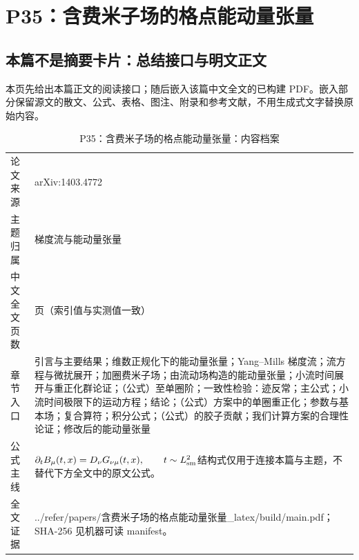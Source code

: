 \documentclass[UTF8,11pt,oneside]{ctexbook}
\begin{document}
\chapter{P35：含费米子场的格点能动量张量}
\section*{本篇不是摘要卡片：总结接口与明文正文}
本页先给出本篇正文的阅读接口；随后嵌入该篇中文全文的已构建 PDF。嵌入部分保留源文的散文、公式、表格、图注、附录和参考文献，不用生成式文字替换原始内容。
\begin{table}[htbp]
  \centering
  \caption{P35：含费米子场的格点能动量张量：内容档案}
  \small
  \begin{tabularx}{0.96\textwidth}{@{}p{3.3cm}>{\raggedright\arraybackslash}X@{}}
    \toprule
    论文来源 & arXiv:1403.4772 \\
    主题归属 & 梯度流与能动量张量 \\
    中文全文页数 & 31 页（索引值与实测值一致） \\
    章节入口 & 引言与主要结果；维数正规化下的能动量张量；Yang–Mills 梯度流；流方程与微扰展开；加圈费米子场；由流动场构造的能动量张量；小流时间展开与重正化群论证；（公式）至单圈阶；一致性检验：迹反常；主公式；小流时间极限下的运动方程；结论；（公式）方案中的单圈重正化；参数与基本场；复合算符；积分公式；（公式）的胶子贡献；我们计算方案的合理性论证；修改后的能动量张量 \\
    公式主线 & $\partial_t B_\mu(t,x)=D_\nu G_{\nu\mu}(t,x),\qquad t\sim L_{\rm sm}^{2}$\newline\scriptsize 结构式仅用于连接本篇与主题，不替代下方全文中的原文公式。 \\
    全文证据 & ../\allowbreak{}refer/\allowbreak{}papers/\allowbreak{}含费米子场的格点能动量张量\_\allowbreak{}latex/\allowbreak{}build/\allowbreak{}main.pdf；SHA-256 见机器可读 manifest。 \\
    \bottomrule
  \end{tabularx}
\end{table}
\end{document}
